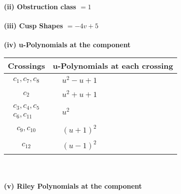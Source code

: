 \documentclass[1p]{elsarticle_modified}
\theoremstyle{definition}
\begin{document}
\flushleft \textbf{(ii) Obstruction class $= 1$}\\~\\
\flushleft \textbf{(iii) Cusp Shapes $= -4 v+5$}\\~\\
\newpage\renewcommand{\arraystretch}{1}
\flushleft \textbf{(iv) u-Polynomials at the component}\newline \\
\begin{tabular}{m{50pt}|m{274pt}}
Crossings & \hspace{64pt}u-Polynomials at each crossing \\
\hline $$\begin{aligned}c_{1},c_{7},c_{8}\end{aligned}$$&$\begin{aligned}
&u^2- u+1
\end{aligned}$\\
\hline $$\begin{aligned}c_{2}\end{aligned}$$&$\begin{aligned}
&u^2+u+1
\end{aligned}$\\
\hline $$\begin{aligned}c_{3},c_{4},c_{5}\\c_{6},c_{11}\end{aligned}$$&$\begin{aligned}
&u^2
\end{aligned}$\\
\hline $$\begin{aligned}c_{9},c_{10}\end{aligned}$$&$\begin{aligned}
&(u+1)^2
\end{aligned}$\\
\hline $$\begin{aligned}c_{12}\end{aligned}$$&$\begin{aligned}
&(u-1)^2
\end{aligned}$\\
\hline
\end{tabular}\\~\\
\newpage\renewcommand{\arraystretch}{1}
\flushleft \textbf{(v) Riley Polynomials at the component}\newline \\
\end{document}
